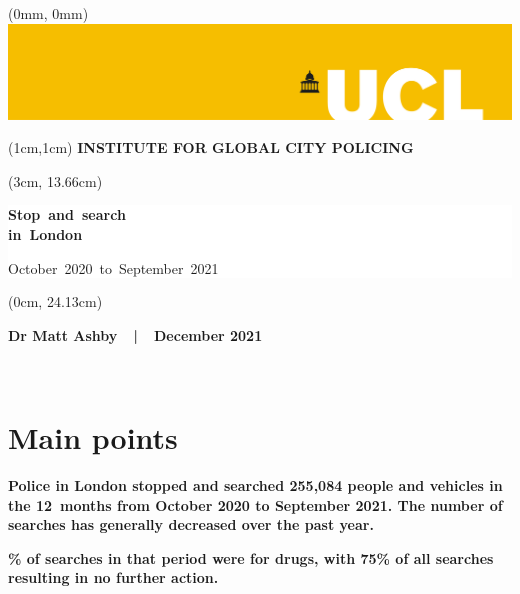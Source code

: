\documentclass[
  a4paper,
  twoside, 11pt]{article}
\begin{document}
\begin{textblock*}{21cm}(0mm, 0mm)
\includegraphics[width=21cm]{../ucl-banner-port-yellow-rgb-lg.png}
\end{textblock*}

\begin{textblock*}{21cm}(1cm,1cm)
\textbf{\sffamily INSTITUTE FOR GLOBAL CITY POLICING}
\end{textblock*}

\begin{textblock*}{18cm}(3cm, 13.66cm)
\raggedright \sffamily
\begin{singlespace}
\colorbox{white}{\hspace{1cm}\parbox[c][5.9cm]{16cm}{
{\fontsize{40}{32}\selectfont \bfseries \mbox{Stop and search}\\\mbox{in London}
\vspace{6pt}}

{\fontsize{32}{26}\selectfont \mbox{October 2020 to September 2021} }

}\hspace{1cm}}
\end{singlespace}
\end{textblock*}

\begin{textblock*}{11.43cm}(0cm, 24.13cm)
\colorbox{uclyellow}{\parbox[c][2.63cm]{\textwidth}{
\centering \bfseries \sffamily \fontsize{16}{16}\selectfont 
Dr Matt Ashby\ \ |\ \ December 2021
}}
\end{textblock*}

~

\thispagestyle{empty}
\newpage

\hypertarget{main-points}{%
\section{Main points}\label{main-points}}

\textbf{\sffamily Police in London stopped and searched 255,084 people and vehicles in the 12~months from October 2020 to September 2021. The number of searches has generally decreased over the past year.}

\textbf{\% of searches in that period were for drugs, with 75\% of all searches resulting in no further action.}
\end{document}
